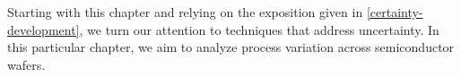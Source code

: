 Starting with this chapter and relying on the exposition given in
\cref{certainty-development}, we turn our attention to techniques that address
uncertainty. In this particular chapter, we aim to analyze process variation
across semiconductor wafers.

\section{\introductiontitle}

\section{\motivationtitle}

\section{\problemtitle}

\section{\pasttitle}

\section{\solutiontitle}

\section{\resultstitle}

\section{\conclusiontitle}
